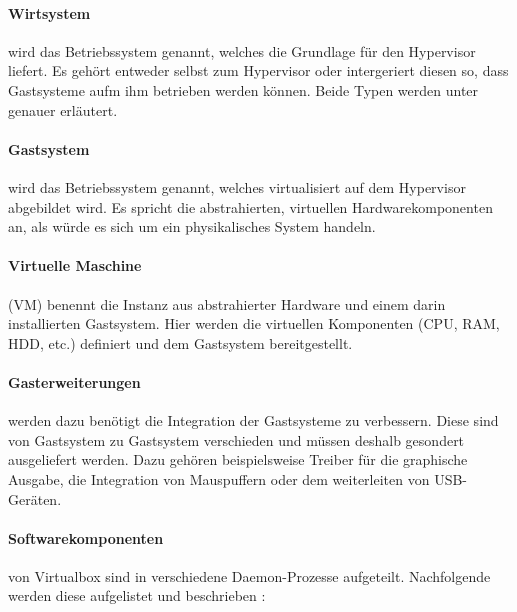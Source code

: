 \paragraph{Wirtsystem} wird das Betriebssystem genannt, welches die Grundlage für den Hypervisor
liefert. Es gehört entweder selbst zum Hypervisor oder intergeriert diesen so, dass Gastsysteme
aufm ihm betrieben werden können. Beide Typen werden unter  genauer
erläutert.

\paragraph{Gastsystem} wird das Betriebssystem genannt, welches virtualisiert auf dem Hypervisor
abgebildet wird. Es spricht die abstrahierten, virtuellen Hardwarekomponenten an, als würde
es sich um ein physikalisches System handeln.

\paragraph{Virtuelle Maschine} (VM) benennt die Instanz aus abstrahierter Hardware und einem
darin installierten Gastsystem. Hier werden die virtuellen Komponenten (CPU, RAM, HDD, etc.)
definiert und dem Gastsystem bereitgestellt.

\paragraph{Gasterweiterungen} werden dazu benötigt die Integration der Gastsysteme zu verbessern.
Diese sind von Gastsystem zu Gastsystem verschieden und müssen deshalb gesondert ausgeliefert werden.
Dazu gehören beispielsweise Treiber für die graphische Ausgabe, die Integration von Mauspuffern
oder dem weiterleiten von USB-Geräten.

\paragraph{Softwarekomponenten} von Virtualbox sind in verschiedene Daemon-Prozesse aufgeteilt.
Nachfolgende werden diese aufgelistet und beschrieben \cite{victor10}:\vspace*{5mm}

